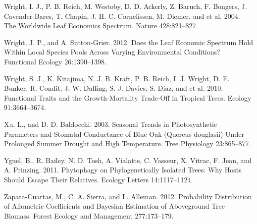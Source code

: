 \documentclass[11pt]{article}
\begin{document}
\begin{hangparas}{1.5em}{1}
\hypertarget{citeproc_bib_item_122}{Wright, I. J., P. B. Reich, M. Westoby, D. D. Ackerly, Z. Baruch, F. Bongers, J. Cavender-Bares, T. Chapin, J. H. C. Cornelissen, M. Diemer, and et al. 2004. The Worldwide Leaf Economics Spectrum. Nature 428:821–827.}

\hypertarget{citeproc_bib_item_123}{Wright, J. P., and A. Sutton-Grier. 2012. Does the Leaf Economic Spectrum Hold Within Local Species Pools Across Varying Environmental Conditions? Functional Ecology 26:1390–1398.}

\hypertarget{citeproc_bib_item_124}{Wright, S. J., K. Kitajima, N. J. B. Kraft, P. B. Reich, I. J. Wright, D. E. Bunker, R. Condit, J. W. Dalling, S. J. Davies, S. Díaz, and et al. 2010. Functional Traits and the Growth-Mortality Trade-Off in Tropical Trees. Ecology 91:3664–3674.}

\hypertarget{citeproc_bib_item_125}{Xu, L., and D. D. Baldocchi. 2003. Seasonal Trends in Photosynthetic Parameters and Stomatal Conductance of Blue Oak (Quercus douglasii) Under Prolonged Summer Drought and High Temperature. Tree Physiology 23:865–877.}

\hypertarget{citeproc_bib_item_126}{Yguel, B., R. Bailey, N. D. Tosh, A. Vialatte, C. Vasseur, X. Vitrac, F. Jean, and A. Prinzing. 2011. Phytophagy on Phylogenetically Isolated Trees: Why Hosts Should Escape Their Relatives. Ecology Letters 14:1117–1124.}

\hypertarget{citeproc_bib_item_127}{Zapata-Cuartas, M., C. A. Sierra, and L. Alleman. 2012. Probability Distribution of Allometric Coefficients and Bayesian Estimation of Aboveground Tree Biomass. Forest Ecology and Management 277:173–179.}
\end{hangparas}
\end{document}
